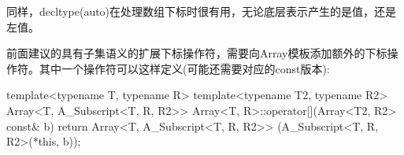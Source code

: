 同样，decltype(auto)在处理数组下标时很有用，无论底层表示产生的是值，还是左值。

前面建议的具有子集语义的扩展下标操作符，需要向Array模板添加额外的下标操作符。其中一个操作符可以这样定义(可能还需要对应的const版本):

\begin{cpp}
template<typename T, typename R>
template<typename T2, typename R2>
Array<T, A_Subscript<T, R, R2>>
Array<T, R>::operator[](Array<T2, R2> const& b) {
	return Array<T, A_Subscript<T, R, R2>>
		(A_Subscript<T, R, R2>(*this, b));
}
\end{cpp}













